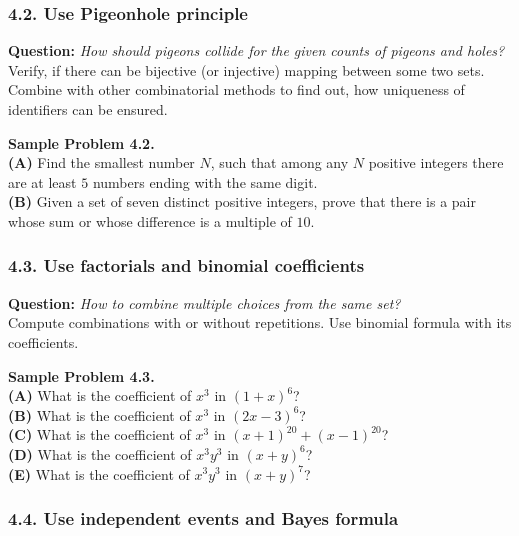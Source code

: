 \documentclass[jou]{apa6}
\begin{document}
\subsubsection{4.2. Use Pigeonhole principle} 

{\bf Question:} {\em How should pigeons collide for the given counts of pigeons and holes?}\\
{\scriptsize 
Verify, if there can be bijective (or injective) 
mapping between some two sets. Combine with other combinatorial 
methods to find out, how uniqueness of identifiers can be ensured.
}


\vspace{6pt}
{\bf Sample Problem 4.2.}\\ 
{\bf (A)} Find the smallest number $N$, 
such that among any $N$ positive integers 
there are at least $5$ numbers ending with the same digit.\\
{\bf (B)} Given a set of seven distinct positive integers, 
prove that there is a pair whose sum or whose
difference is a multiple of $10$.




\subsubsection{4.3. Use factorials and binomial coefficients} 

{\bf Question:} {\em How to combine multiple choices from the same set?}\\
{\scriptsize 
Compute combinations with or without repetitions. Use binomial formula with its coefficients. 
}

\vspace{6pt}
{\bf Sample Problem 4.3.}\\
{\bf (A)} What is the coefficient of $x^3$ in $(1 + x)^6$? \\
{\bf (B)} What is the coefficient of $x^3$ in $(2x - 3)^6$?\\
{\bf (C)} What is the coefficient of $x^3$ in $(x + 1)^{20} + (x-1)^{20}$? \\
{\bf (D)} What is the coefficient of $x^3y^3$ in $(x+y)^6$? \\
{\bf (E)} What is the coefficient of $x^3y^3$ in $(x+y)^7$?

\subsubsection{4.4. Use independent events and Bayes formula}
\end{document}
